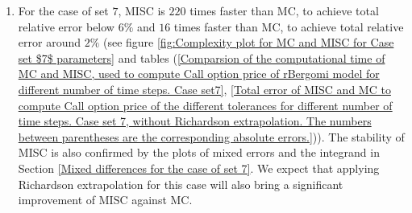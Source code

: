 \documentclass[11pt]{article}
\begin{document}
\begin{itemize}
\begin{enumerate}
	\item For the case of set $7$, MISC is  $220$ times faster than MC, to achieve total relative error below $6\%$ and $16$ times faster than MC, to achieve total relative error around $2\%$  (see figure \ref{fig:Complexity plot for MC and MISC for Case set $7$ parameters} and tables (\ref{Comparsion of the computational time of  MC and MISC, used to compute Call option price of rBergomi model for different number of time steps. Case set7}, \ref{Total error of MISC and MC to compute Call option price of the different tolerances for different number of time steps. Case set 7, without Richardson extrapolation. The numbers between parentheses are the corresponding absolute errors.})). The stability of MISC is also confirmed by the plots of mixed errors and the integrand in Section \ref{Mixed differences for the case of set 7}. We expect that applying Richardson extrapolation for this case will also bring a significant improvement of MISC against MC.
		

\end{enumerate}
\end{itemize}
\end{document}
